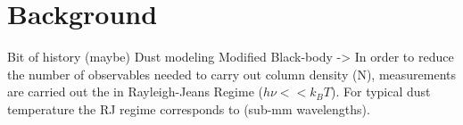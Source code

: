 \chapter{Background}
\label{chap:background}

Bit of history (maybe)
Dust modeling
Modified Black-body
-> In order to reduce the number of observables needed to carry out column density (N), measurements are carried out the in Rayleigh-Jeans Regime ($h\nu << k_B T$). For typical dust temperature the RJ regime corresponds to (sub-mm wavelengths).


